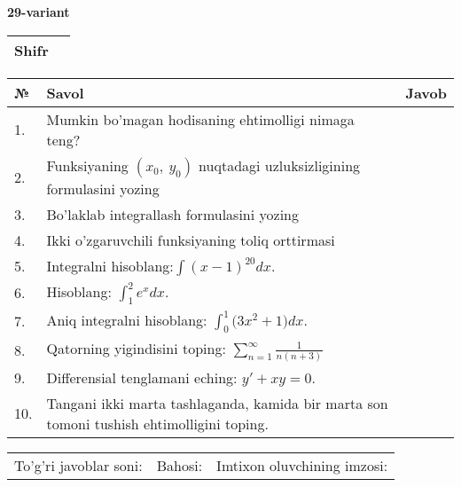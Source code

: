 \documentclass{article}
\begin{document}
  \egroup
  
  \newpage
  
  
  \textbf{29-variant}\\
  
  \bgroup
  \def\arraystretch{1.6} %
  
  \begin{tabular}{|m{5.7cm}|m{9.5cm}|}
  \hline
  Shifr & \\
  \hline
  \end{tabular}
  
  \vspace{1cm}
  
  \begin{tabular}{|m{0.7cm}|m{10cm}|m{4cm}|}
  \hline
  № & Savol & Javob \\
  \hline
  1. & Mumkin bo'magan hodisaning ehtimolligi nimaga teng? &  \\
  \hline
  2. & Funksiyaning \((x_{0},\ y_{0})\) nuqtadagi uzluksizligining formulasini yozing &  \\
  \hline
  3. & Bo'laklab integrallash formulasini yozing &  \\
  \hline
  4. & Ikki o'zgaruvchili funksiyaning toliq orttirmasi &  \\
  \hline
  5. & Integralni hisoblang:\(\int {(x - 1)^{20}}dx\). &  \\
  \hline
  6. & Hisoblang: \(\int_{1}^{2}{e^{x}dx}\). &  \\
  \hline
  7. & Aniq integralni hisoblang: \(\int_{0}^{1}{(3x^{2}} + 1)dx\). &  \\
  \hline
  8. & Qatorning yigindisini toping: \(\sum_{n = 1}^{\infty}\frac{1}{n(n + 3)}\) &  \\
  \hline
  9. & Differensial tenglamani eching: \(y' + xy = 0\). &  \\
  \hline
  10. & Tangani ikki marta tashlaganda, kamida bir marta son tomoni tushish ehtimolligini toping. &  \\
  \hline
  \end{tabular}
  
  \vspace{1cm}
  
  \begin{tabular}{lll}
  To'g'ri javoblar soni: \underline{\hspace{1.5cm}} & 
  Bahosi: \underline{\hspace{1.5cm}} & 
  Imtixon oluvchining imzosi: \underline{\hspace{2cm}} \\
  \end{tabular}
  
\end{document}
